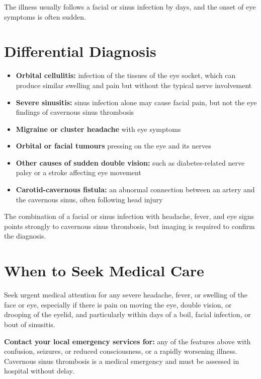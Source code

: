 The illness usually follows a facial or sinus infection by days, and the onset of eye symptoms is often sudden.

\section*{Differential Diagnosis}
\begin{itemize}
    \item \textbf{Orbital cellulitis:} infection of the tissues of the eye socket, which can produce similar swelling and pain but without the typical nerve involvement
    \item \textbf{Severe sinusitis:} sinus infection alone may cause facial pain, but not the eye findings of cavernous sinus thrombosis
    \item \textbf{Migraine or cluster headache} with eye symptoms
    \item \textbf{Orbital or facial tumours} pressing on the eye and its nerves
    \item \textbf{Other causes of sudden double vision:} such as diabetes-related nerve palsy or a stroke affecting eye movement
    \item \textbf{Carotid-cavernous fistula:} an abnormal connection between an artery and the cavernous sinus, often following head injury
\end{itemize}

The combination of a facial or sinus infection with headache, fever, and eye signs points strongly to cavernous sinus thrombosis, but imaging is required to confirm the diagnosis.

\section*{When to Seek Medical Care}
Seek urgent medical attention for any severe headache, fever, or swelling of the face or eye, especially if there is pain on moving the eye, double vision, or drooping of the eyelid, and particularly within days of a boil, facial infection, or bout of sinusitis.

\textbf{Contact your local emergency services for:} any of the features above with confusion, seizures, or reduced consciousness, or a rapidly worsening illness. Cavernous sinus thrombosis is a medical emergency and must be assessed in hospital without delay.

